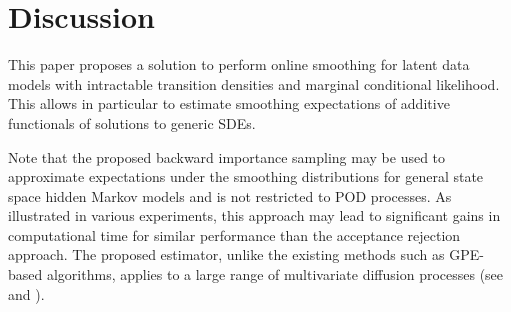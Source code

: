 \documentclass{article}
\newcommand{\md}[1]{g_{#1}}
\newcommand{\pred}[1]{\pi_{#1}}
\newcommand{\parvec}{\theta}
\newcommand{\deriv}{\nabla_{\parvec}}
\newcommand{\set}[1]{\mathsf{#1}}
\newcommand{\eqdef}{\ensuremath{:=}}
\newcommand{\eqsp}{\;}
\begin{document}
%
%
%




\section{Discussion}
\label{sec:discussion} 
This paper proposes a solution to  perform online smoothing for latent data models with intractable transition densities and marginal conditional likelihood. This allows in particular to estimate smoothing expectations of additive functionals of solutions to generic SDEs.%

Note that the proposed backward importance sampling may be used to approximate expectations under the smoothing distributions for general state space hidden Markov models and  is not restricted to POD processes. As illustrated in various experiments, this approach may lead to significant  gains in computational time for similar performance than the acceptance rejection approach.  The proposed estimator, unlike the existing methods such as GPE-based algorithms, applies to a large range of multivariate diffusion processes (see \cite{andersson2017unbiased} and \cite{fearnhead2017continuous}).
\end{document}
